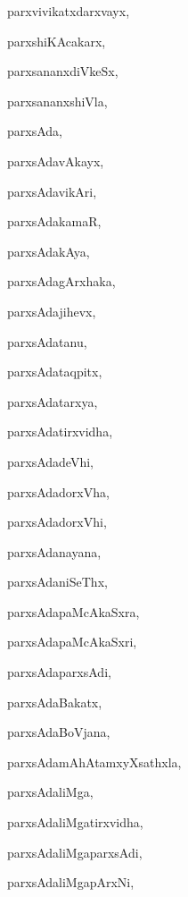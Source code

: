 \begin{multicols}{2}
{parxvivikatxdarxvayx}, \pageref{parxvivikatxdarxvayx}

{parxshiKAcakarx}, \pageref{parxshiKAcakarx}

{parxsananxdiVkeSx}, \pageref{parxsananxdiVkeSx}

{parxsananxshiVla}, \pageref{parxsananxshiVla}

{parxsAda}, \pageref{parxsAda}

{parxsAdavAkayx}, \pageref{parxsAdavAkayx}

{parxsAdavikAri}, \pageref{parxsAdavikAri1}

{parxsAdakamaR}, \pageref{parxsAdakamaR}

{parxsAdakAya}, \pageref{parxsAdakAya}

{parxsAdagArxhaka}, \pageref{parxsAdagArxhaka}

{parxsAdajihevx}, \pageref{parxsAdajihevx}

{parxsAdatanu}, \pageref{parxsAdatanu}

{parxsAdataqpitx}, \pageref{parxsAdataqpitx}

{parxsAdatarxya}, \pageref{parxsAdatarxya}

{parxsAdatirxvidha}, \pageref{parxsAdatirxvidha}

{parxsAdadeVhi}, \pageref{parxsAdadeVhi}

{parxsAdadorxVha}, \pageref{parxsAdadorxVha}

{parxsAdadorxVhi}, \pageref{parxsAdadorxVhi}

{parxsAdanayana}, \pageref{parxsAdanayana}

{parxsAdaniSeThx}, \pageref{parxsAdaniSeThx}

{parxsAdapaMcAkaSxra}, \pageref{parxsAdapaMcAkaSxra}

{parxsAdapaMcAkaSxri}, \pageref{parxsAdapaMcAkaSxri}

{parxsAdaparxsAdi}, \pageref{parxsAdaparxsAdi}

{parxsAdaBakatx}, \pageref{parxsAdaBakatx}

{parxsAdaBoVjana}, \pageref{parxsAdaBoVjana}

{parxsAdamAhAtamxyXsathxla}, \pageref{parxsAdamAhAtamxyXsathxla}

{parxsAdaliMga}, \pageref{parxsAdaliMga}

{parxsAdaliMgatirxvidha}, \pageref{parxsAdaliMgatirxvidha}

{parxsAdaliMgaparxsAdi}, \pageref{parxsAdaliMgaparxsAdi}

{parxsAdaliMgapArxNi}, \pageref{parxsAdaliMgapArxNi}


\end{multicols}

